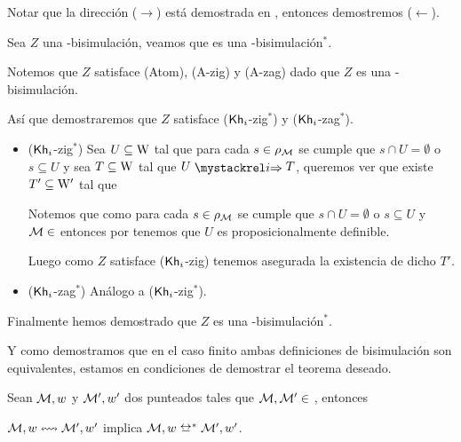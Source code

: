 \begin{demostracion}
    Notar que la dirección ($\rightarrow$) está demostrada en , entonces demostremos ($\leftarrow$).
    
    Sea $Z$ una \KHilogic-bisimulación, veamos que es una \KHilogic-bisimulación$^*$.

    Notemos que $Z$ satisface (Atom), (A-zig) y (A-zag) dado que $Z$ es una \KHilogic-bisimulación.

    Así que demostraremos que $Z$ satisface ($\mathsf{Kh}_i$-zig$^*$) y ($\mathsf{Kh}_i$-zag$^*$).

    \begin{itemize}
        \item ($\mathsf{Kh}_i$-zig$^*$) Sea $U \subseteq \mathrm{W}$ tal que para cada $s \in \rho_{\mathcal{M}}$ se cumple que $s \cap U = \emptyset$ o $s \subseteq U$ 
        y sea $T \subseteq \mathrm{W}$ tal que $U \ultsExecAgi T$, queremos ver que existe $T' \subseteq \mathrm{W}'$ tal que

        \begin{multicols}{2}
        \end{multicols}

        Notemos que como para cada $s \in \rho_{\mathcal{M}}$ se cumple que $s \cap U = \emptyset$ o $s \subseteq U$ y $\mathcal{M} \in $ \MFD entonces 
        por  tenemos que $U$ es proposicionalmente definible.
    
        Luego como $Z$ satisface ($\mathsf{Kh}_i$-zig) tenemos asegurada la existencia de dicho $T'$.
    
        \item ($\mathsf{Kh}_i$-zag$^*$) Análogo a ($\mathsf{Kh}_i$-zig$^*$). 
    \end{itemize}

    Finalmente hemos demostrado que $Z$ es una \KHilogic-bisimulación$^*$.
\end{demostracion}

Y como demostramos que en el caso finito ambas definiciones de bisimulación son equivalentes, estamos en condiciones de demostrar el teorema deseado. 

\begin{teorema}\label{thm:new-bisim-finite-equiv}
    Sean $\mathcal{M},w$ y $\mathcal{M}',w'$ dos \ultss punteados tales que $\mathcal{M}, \mathcal{M}' \in$ \MFD, entonces
    \begin{center}
        $\mathcal{M},w \mathrel{\leftrightsquigarrow} \mathcal{M}', w'$ implica $\model,w \bisim^* \model', w'$.
    \end{center}
\end{teorema}

